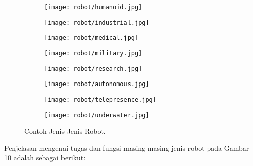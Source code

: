 \begin{figure}[H]
\begin{subfigure}[b]{.23\textwidth}
        \label{rob:subfig8}
    \end{subfigure}
    \begin{subfigure}[b]{.23\textwidth}
        \texttt{[image: robot/humanoid.jpg]}
        \caption{}
        \label{rob:subfig9}
    \end{subfigure}
    \begin{subfigure}[b]{.23\textwidth}
        \texttt{[image: robot/industrial.jpg]}
        \caption{}
        \label{rob:subfig10}
    \end{subfigure}
    \begin{subfigure}[b]{.23\textwidth}
        \texttt{[image: robot/medical.jpg]}
        \caption{}
        \label{rob:subfig11}
    \end{subfigure}
    \begin{subfigure}[b]{.23\textwidth}
        \texttt{[image: robot/military.jpg]}
        \caption{}
        \label{rob:subfig12}
    \end{subfigure}
    \begin{subfigure}[b]{.23\textwidth}
        \texttt{[image: robot/research.jpg]}
        \caption{}
        \label{rob:subfig13}
    \end{subfigure}
    \begin{subfigure}[b]{.23\textwidth}
        \texttt{[image: robot/autonomous.jpg]}
        \caption{}
        \label{rob:subfig2}
    \end{subfigure}
    \begin{subfigure}[b]{.23\textwidth}
        \texttt{[image: robot/telepresence.jpg]}
        \caption{}
        \label{rob:subfig14}
    \end{subfigure}
    \begin{subfigure}[b]{.23\textwidth}
        \texttt{[image: robot/underwater.jpg]}
        \caption{}
        \label{rob:subfig15}
    \end{subfigure}
    \caption{Contoh Jenis-Jenis Robot\cite{b1}.}
    \label{fig:robot_figures}
\end{figure}
Penjelasan mengenai tugas dan fungsi masing-masing jenis robot pada Gambar \ref*{fig:robot_figures} adalah sebagai berikut:
